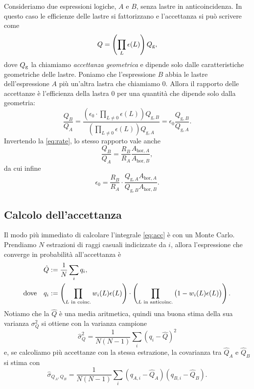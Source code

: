 Consideriamo due espressioni logiche, $A$ e $B$, senza lastre in anticoincidenza.
In questo caso le efficienze delle lastre si fattorizzano e l'accettanza si può scrivere come
\begin{equation*}
	Q = \left( \prod_L \epsilon(L) \right) Q_\text g,
\end{equation*}
dove $Q_\text g$ la chiamiamo \emph{accettanza geometrica}
e dipende solo dalle caratteristiche geometriche delle lastre.
Poniamo che l'espressione $B$ abbia le lastre dell'espressione $A$ più un'altra lastra che chiamiamo $0$.
Allora il rapporto delle accettanze è l'efficienza della lastra $0$ per una quantità che dipende solo dalla geometria:
\begin{equation*}
	\frac{Q_B}{Q_A} = \frac
	{\left( \epsilon_0 \cdot \prod_{L\neq 0} \epsilon(L) \right) Q_{\text{g},B}}
	{\left( \prod_{L\neq 0} \epsilon(L) \right) Q_{\text{g},A}}
	= \epsilon_0 \frac{Q_{\text{g},B}}{Q_{\text{g},A}}.
\end{equation*}
Invertendo la \eqref{eq:rate}, lo stesso rapporto vale anche
\begin{equation*}
	\frac{Q_B}{Q_A} = \frac{R_B}{R_A} \frac{A_{\text{hor},A}}{A_{\text{hor},B}},
\end{equation*}
da cui infine
\begin{equation*}
	\epsilon_0 = \frac{R_B}{R_A} \cdot \frac{Q_{\text{g},A} A_{\text{hor},A}}{Q_{\text{g},B} A_{\text{hor},B}}.
\end{equation*}

\subsection{Calcolo dell'accettanza}

Il modo più immediato di calcolare l'integrale \eqref{eq:acc} è con un Monte Carlo.
Prendiamo $N$ estrazioni di raggi casuali indicizzate da $i$,
allora l'espressione che converge in probabilità all'accettanza è
\begin{align}
	\label{eq:accmc}
	\hat Q &:= \frac1N \sum_i q_i, \\
	\text{dove}\quad q_i &:=
	\left( \prod_\text{$L$ in coinc.} w_i(L) \epsilon(L) \right)
	\cdot \left( \prod_\text{$L$ in anticoinc.} \big(1 - w_i(L) \epsilon(L)\big) \right). \notag
\end{align}
Notiamo che la $\hat Q$ è una media aritmetica,
quindi una buona stima della sua varianza $\sigma_Q^2$ si ottiene con la varianza campione
\begin{equation*}
	\hat\sigma_Q^2
	= \frac1{N(N-1)} \sum_i (q_i - \hat Q)^2
\end{equation*}
e, se calcoliamo più accettanze con la stessa estrazione,
la covarianza tra $\hat Q_A$ e $\hat Q_B$ si stima con
\begin{equation*}
	\hat\sigma_{Q_A,Q_B}
	= \frac1{N(N-1)} \sum_i (q_{A,i} - \hat Q_A) (q_{B,i} - \hat Q_B).
\end{equation*}
